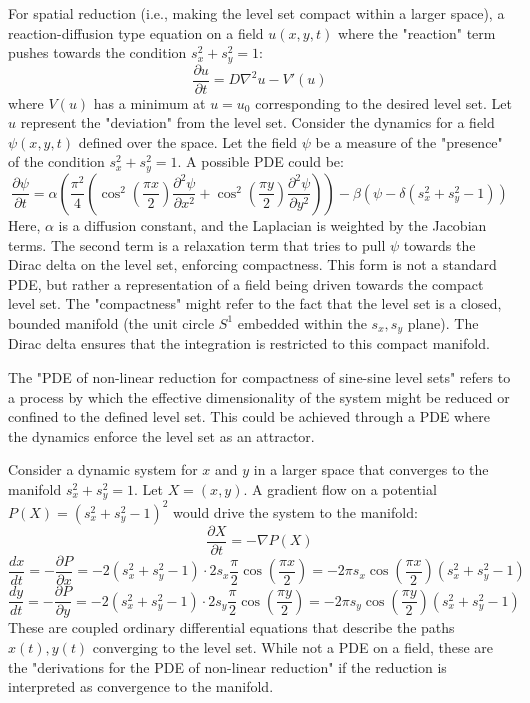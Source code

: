 ﻿\documentclass[12pt]{article}
\begin{document}
For spatial reduction (i.e., making the level set compact within a larger space), a reaction-diffusion type equation on a field $u(x,y,t)$ where the "reaction" term pushes towards the condition $s_x^2+s_y^2=1$:
$$ \frac{\partial u}{\partial t} = D \nabla^2 u - V'(u) $$
where $V(u)$ has a minimum at $u=u_0$ corresponding to the desired level set.
Let $u$ represent the "deviation" from the level set.
Consider the dynamics for a field $\psi(x,y,t)$ defined over the space.
Let the field $\psi$ be a measure of the "presence" of the condition $s_x^2+s_y^2=1$.
A possible PDE could be:
$$ \frac{\partial \psi}{\partial t} = \alpha \left( \frac{\pi^2}{4}\left(\cos^2\left(\frac{\pi x}{2}\right)\frac{\partial^2\psi}{\partial x^2} + \cos^2\left(\frac{\pi y}{2}\right)\frac{\partial^2\psi}{\partial y^2}\right) \right) - \beta \left( \psi - \delta(s_x^2+s_y^2-1) \right) $$
Here, $\alpha$ is a diffusion constant, and the Laplacian is weighted by the Jacobian terms. The second term is a relaxation term that tries to pull $\psi$ towards the Dirac delta on the level set, enforcing compactness.
This form is not a standard PDE, but rather a representation of a field being driven towards the compact level set.
The "compactness" might refer to the fact that the level set is a closed, bounded manifold (the unit circle $S^1$ embedded within the $s_x, s_y$ plane). The Dirac delta ensures that the integration is restricted to this compact manifold.

The "PDE of non-linear reduction for compactness of sine-sine level sets" refers to a process by which the effective dimensionality of the system might be reduced or confined to the defined level set. This could be achieved through a PDE where the dynamics enforce the level set as an attractor.

Consider a dynamic system for $x$ and $y$ in a larger space that converges to the manifold $s_x^2 + s_y^2 = 1$. Let $X = (x,y)$.
A gradient flow on a potential $P(X) = (s_x^2 + s_y^2 - 1)^2$ would drive the system to the manifold:
$$ \frac{\partial X}{\partial t} = - \nabla P(X) $$
$$ \frac{dx}{dt} = - \frac{\partial P}{\partial x} = - 2(s_x^2 + s_y^2 - 1) \cdot 2s_x \frac{\pi}{2} \cos\left(\frac{\pi x}{2}\right) = -2\pi s_x \cos\left(\frac{\pi x}{2}\right) (s_x^2 + s_y^2 - 1) $$
$$ \frac{dy}{dt} = - \frac{\partial P}{\partial y} = - 2(s_x^2 + s_y^2 - 1) \cdot 2s_y \frac{\pi}{2} \cos\left(\frac{\pi y}{2}\right) = -2\pi s_y \cos\left(\frac{\pi y}{2}\right) (s_x^2 + s_y^2 - 1) $$
These are coupled ordinary differential equations that describe the paths $x(t), y(t)$ converging to the level set. While not a PDE on a field, these are the "derivations for the PDE of non-linear reduction" if the reduction is interpreted as convergence to the manifold.
\end{document}
